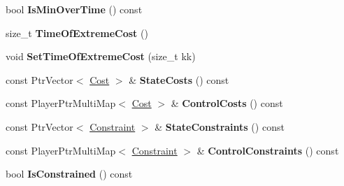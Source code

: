 \begin{DoxyCompactItemize}
\item 
bool {\bfseries Is\+Min\+Over\+Time} () const \hypertarget{classilqgames_1_1_player_cost_aff2f1b2d48982fa767c8cd9ad770710f}{}\label{classilqgames_1_1_player_cost_aff2f1b2d48982fa767c8cd9ad770710f}

\item 
size\+\_\+t {\bfseries Time\+Of\+Extreme\+Cost} ()\hypertarget{classilqgames_1_1_player_cost_a1bacfa4c40e98588431d67e1f4b96919}{}\label{classilqgames_1_1_player_cost_a1bacfa4c40e98588431d67e1f4b96919}

\item 
void {\bfseries Set\+Time\+Of\+Extreme\+Cost} (size\+\_\+t kk)\hypertarget{classilqgames_1_1_player_cost_ab1d9aea9b9f86f5fbc785cd8981ccd81}{}\label{classilqgames_1_1_player_cost_ab1d9aea9b9f86f5fbc785cd8981ccd81}

\item 
const Ptr\+Vector$<$ \hyperlink{classilqgames_1_1_cost}{Cost} $>$ \& {\bfseries State\+Costs} () const \hypertarget{classilqgames_1_1_player_cost_a16a676ec8d145d97d555cbebe79ac5fd}{}\label{classilqgames_1_1_player_cost_a16a676ec8d145d97d555cbebe79ac5fd}

\item 
const Player\+Ptr\+Multi\+Map$<$ \hyperlink{classilqgames_1_1_cost}{Cost} $>$ \& {\bfseries Control\+Costs} () const \hypertarget{classilqgames_1_1_player_cost_aa6d470d800deac7f52eb54ae180648c5}{}\label{classilqgames_1_1_player_cost_aa6d470d800deac7f52eb54ae180648c5}

\item 
const Ptr\+Vector$<$ \hyperlink{classilqgames_1_1_constraint}{Constraint} $>$ \& {\bfseries State\+Constraints} () const \hypertarget{classilqgames_1_1_player_cost_a5c0fdceae7cb5c2a41c9e2962fad63ea}{}\label{classilqgames_1_1_player_cost_a5c0fdceae7cb5c2a41c9e2962fad63ea}

\item 
const Player\+Ptr\+Multi\+Map$<$ \hyperlink{classilqgames_1_1_constraint}{Constraint} $>$ \& {\bfseries Control\+Constraints} () const \hypertarget{classilqgames_1_1_player_cost_a4de79c8a7df42e68d39cc5afdb7fa6a6}{}\label{classilqgames_1_1_player_cost_a4de79c8a7df42e68d39cc5afdb7fa6a6}

\item 
bool {\bfseries Is\+Constrained} () const \hypertarget{classilqgames_1_1_player_cost_a700b6b0ce1844c3f780cb59b28bc5cd8}{}\label{classilqgames_1_1_player_cost_a700b6b0ce1844c3f780cb59b28bc5cd8}

\end{DoxyCompactItemize}


